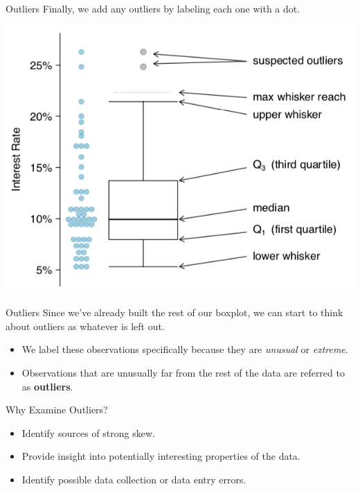 \begin{frame}{Outliers}
    Finally, we add any outliers by labeling each one with a dot.
    \begin{center}
        \includegraphics[scale=0.35]{images/boxplot.png}
    \end{center}
\end{frame}

\begin{frame}{Outliers}
    Since we've already built the rest of our boxplot, we can start to think about outliers as whatever is left out. 
    \begin{itemize}
        \item We label these observations specifically because they are \textit{unusual} or \textit{extreme}.
        \item Observations that are unusually far from the rest of the data are referred to as \textbf{outliers}.
    \end{itemize}
\end{frame}

\begin{frame}{Why Examine Outliers?}
    \begin{itemize}
        \item Identify sources of strong skew.
        \item Provide insight into potentially interesting properties of the data.
        \item Identify possible data collection or data entry errors.
    \end{itemize}
\end{frame}

